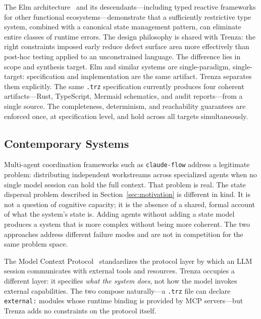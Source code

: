 The Elm architecture~\cite{czaplicki2012elm} and its descendants---including
typed reactive frameworks for other functional ecosystems---demonstrate that a
sufficiently restrictive type system, combined with a canonical state management
pattern, can eliminate entire classes of runtime errors. The design philosophy
is shared with Trenza: the right constraints imposed early reduce defect surface
area more effectively than post-hoc testing applied to an unconstrained language.
The difference lies in scope and synthesis target. Elm and similar systems are
single-paradigm, single-target: specification and implementation are the same
artifact. Trenza separates them explicitly. The same \texttt{.trz} specification
currently produces four coherent artifacts---Rust, TypeScript, Mermaid
schematics, and audit reports---from a single source. The completeness,
determinism, and reachability guarantees are enforced once, at specification
level, and hold across all targets simultaneously.

\subsection{Contemporary Systems}

Multi-agent coordination frameworks such as \texttt{claude-flow}
\cite{claudeflow2024} address a legitimate problem: distributing independent
workstreams across
specialized agents when no single model session can hold the full context.
That problem is real. The state dispersal problem described in
Section~\ref{sec:motivation} is different in kind. It is not a question of
cognitive capacity; it is the absence of a shared, formal account of what the
system's state is. Adding agents without adding a state model produces a system
that is more complex without being more coherent. The two approaches address
different failure modes and are not in competition for the same problem space.

The Model Context Protocol~\cite{anthropic2024mcp} standardizes the protocol
layer by which an LLM session communicates with external tools and resources.
Trenza occupies a different layer: it specifies \emph{what the system does},
not how the model invokes external capabilities. The two compose naturally---a
\texttt{.trz} file can declare \texttt{external:} modules whose runtime binding
is provided by MCP servers---but Trenza adds no constraints on the protocol
itself.
